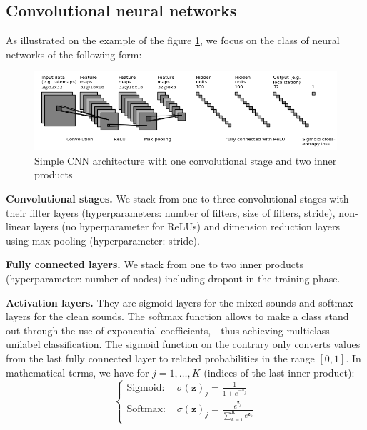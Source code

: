 \subsection{Convolutional neural networks}

As illustrated on the example of the figure \ref{fig:introduction:convnet}, we focus on the class of neural networks of the following form:

\begin{figure}[htb]
\hspace*{-1cm}
\includegraphics[scale=0.85]{images-data/convnet_fig}
\caption{Simple CNN architecture with one convolutional stage and two inner products}
\label{fig:introduction:convnet}
\end{figure}

\textbf{Convolutional stages.} We stack from one to three convolutional stages with their filter layers (hyperparameters: number of filters, size of filters, stride), non-linear layers (no hyperparameter for ReLUs) and dimension reduction layers using max pooling (hyperparameter: stride).

\textbf{Fully connected layers.} We stack from one to two inner products (hyperparameter: number of nodes) including dropout in the training phase.

\textbf{Activation layers.} They are sigmoid layers for the mixed sounds and softmax layers for the clean sounds. The softmax function allows to make a class stand out through the use of exponential coefficients,---thus achieving multiclass unilabel classification. The sigmoid function on the contrary only converts values from the last fully connected layer to related probabilities in the range $[0,1]$. In mathematical terms, we have for $j = 1,\dotsc,K$ (indices of the last inner product):
\begin{equation}
\left\{
\begin{aligned}
\text{Sigmoid: } & \sigma (\mathbf{z})_j = \frac{1}{1 + e^{-\mathbf{z}_j}} \\
\text{Softmax: } & \sigma (\mathbf{z})_j = \frac{e^{\mathbf{z}_j}}{\sum_{k=1}^K e^{\mathbf{z}_k}}
\label{eq:softmax}
\end{aligned}
\right.
\end{equation}

